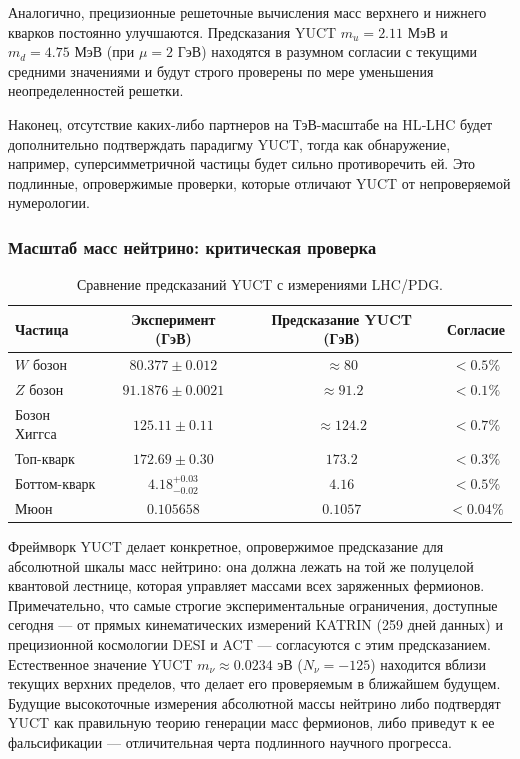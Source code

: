 \documentclass[11pt,a4paper]{article}
\begin{document}
	Аналогично, прецизионные решеточные вычисления масс верхнего и нижнего кварков постоянно улучшаются. Предсказания YUCT $m_u = 2.11$ МэВ и $m_d = 4.75$ МэВ (при $\mu = 2$ ГэВ) находятся в разумном согласии с текущими средними значениями и будут строго проверены по мере уменьшения неопределенностей решетки.
	
	Наконец, отсутствие каких-либо партнеров на ТэВ-масштабе на HL‑LHC будет дополнительно подтверждать парадигму YUCT, тогда как обнаружение, например, суперсимметричной частицы будет сильно противоречить ей. Это подлинные, опровержимые проверки, которые отличают YUCT от непроверяемой нумерологии.
	
	\subsubsection{Масштаб масс нейтрино: критическая проверка}
	\begin{table}[h]
		\centering
		\caption{Сравнение предсказаний YUCT с измерениями LHC/PDG.}
		\normalsize
		\label{tab:lhc_comparison}
		\begin{tabular}{l c c c}
			\toprule
			Частица & Эксперимент (ГэВ) & Предсказание YUCT (ГэВ) & Согласие \\
			\midrule
			$W$ бозон  & $80.377 \pm 0.012$ & $\approx 80$ & $<0.5\%$ \\
			$Z$ бозон  & $91.1876 \pm 0.0021$ & $\approx 91.2$ & $<0.1\%$ \\
			Бозон Хиггса & $125.11 \pm 0.11$ & $\approx 124.2$ & $<0.7\%$ \\
			Топ-кварк  & $172.69 \pm 0.30$ & $173.2$ & $<0.3\%$ \\
			Боттом-кварк & $4.18^{+0.03}_{-0.02}$ & $4.16$ & $<0.5\%$ \\
			Мюон       & $0.105658$ & $0.1057$ & $<0.04\%$ \\
			\bottomrule
		\end{tabular}
	\end{table}
	
	Фреймворк YUCT делает конкретное, опровержимое предсказание для абсолютной шкалы масс нейтрино: она должна лежать на той же полуцелой квантовой лестнице, которая управляет массами всех заряженных фермионов. Примечательно, что самые строгие экспериментальные ограничения, доступные сегодня — от прямых кинематических измерений KATRIN (259 дней данных) и прецизионной космологии DESI и ACT — согласуются с этим предсказанием. Естественное значение YUCT $m_\nu \approx 0.0234$ эВ ($N_\nu = -125$) находится вблизи текущих верхних пределов, что делает его проверяемым в ближайшем будущем. Будущие высокоточные измерения абсолютной массы нейтрино либо подтвердят YUCT как правильную теорию генерации масс фермионов, либо приведут к ее фальсификации — отличительная черта подлинного научного прогресса.
	
\end{document}
